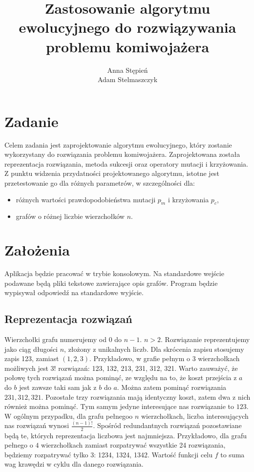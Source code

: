 \documentclass[12pt, a4paper]{article}
\title{\textbf{Zastosowanie algorytmu ewolucyjnego do rozwiązywania problemu komiwojażera}}
\author{Anna Stępień \\ Adam Stelmaszczyk}
\date{}
\begin{document}
\maketitle

\section{Zadanie}
Celem zadania jest zaprojektowanie algorytmu ewolucyjnego, który zostanie wykorzystany do rozwiązania problemu komiwojażera.
Zaprojektowana została reprezentacja rozwiązania, metoda sukcesji oraz operatory mutacji i krzyżowania. 
Z punktu widzenia przydatności projektowanego algorytmu, istotne jest przetestowanie go dla różnych parametrów, w szczególności dla:
\begin{itemize}
	\item różnych wartości prawdopodobieństwa mutacji $p_m$ i krzyżowania $p_c$,
	\item grafów o różnej liczbie wierzchołków $n$.
\end{itemize}

\section{Założenia}
Aplikacja będzie pracować w trybie konsolowym. Na standardowe wejście podawane będą pliki tekstowe zawierające opis grafów.
Program będzie wypisywał odpowiedź na standardowe wyjście.

\subsection{Reprezentacja rozwiązań}

Wierzchołki grafu numerujemy od 0 do $n - 1$. $n > 2$. Rozwiązanie reprezentujemy jako ciąg długości $n$, złożony z unikalnych liczb. 
Dla skrócenia zapisu stosujemy zapis 123, zamiast $(1,2,3)$. Przykładowo, w grafie pełnym o 3 wierzchołkach możliwych jest $3!$ rozwiązań: 123, 132, 213, 231, 312, 321.
Warto zauważyć, że połowę tych rozwiązań można pominąć, ze względu na to, że koszt przejścia z $a$ do $b$ jest zawsze 
taki sam jak z $b$ do $a$. Można zatem pominąć rozwiązania $231, 312, 321$. Pozostałe trzy rozwiązania mają identyczny koszt,
zatem dwa z nich również można pominąć. Tym samym jedyne interesujące nas rozwiązanie to $123$.
W ogólnym przypadku, dla grafu pełnegoo $n$ wierzchołkach, liczba interesujących nas rozwiązań wynosi $\frac{(n-1)!}{2}$. Spośród redundantnych rozwiązań pozostawiane będą te,
których reprezentacja liczbowa jest najmniejsza. Przykładowo, dla grafu pełnego o $4$ wierzchołkach zamiast rozpatrywać wszystkie
24 rozwiązania, będziemy rozpatrywać tylko 3: 1234, 1324, 1342. 
Wartość funkcji celu $f$ to suma wag krawędzi w cyklu dla danego rozwiązania.
\end{document}
